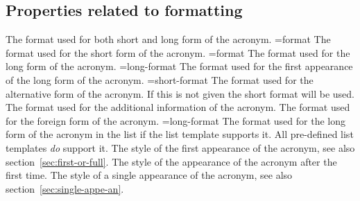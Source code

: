 \documentclass{acro-manual}
\begin{document}
\subsection{Properties related to formatting}\label{sec:prop-relat-form}
\begin{properties}
  \Initial
    The format used for both short and long form of the acronym.
  \Initial={format}
    The format used for the short form of the acronym.
  \Initial={format}
    The format used for the long form of the acronym.
  \Initial={long-format}
    The format used for the first appearance of the long form of the acronym.
  \Initial={short-format}
    The format used for the alternative form of the acronym. If this is not
    given the short format will be used.
  \Initial
    The format used for the additional information of the acronym.
  \Initial
    The format used for the foreign form of the acronym.
  \Initial={long-format}
    The format used for the long form of the acronym in the list if the list
    template supports it. All pre-defined list templates \emph{do} support
    it.
  \Initial
    The style of the first appearance of the acronym, see also
    section~\vref{sec:first-or-full}.
  \Initial
    The style of the appearance of the acronym after the
    first time.
  \Initial
    The style of a single appearance of the acronym, see also
    section~\vref{sec:single-appe-an}.
\end{properties}
\end{document}
